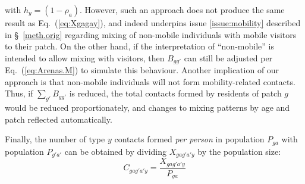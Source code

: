 with $h_y = (1-\rho_a)$.
However, such an approach does not produce the same result as Eq.~(\ref{eq:Xgagay}),
and indeed underpins issue \ref{issue:mobility} described in \S~\ref{meth.orig}
regarding mixing of non-mobile individuals with mobile visitors to their patch.
On the other hand, if the interpretation of ``non-mobile'' is intended to allow mixing with visitors,
then $B_{gg'}$ can still be adjusted per Eq.~(\ref{eq:Arenas.M}) to simulate this behaviour.
Another implication of our approach is that
non-mobile individuals will not form mobility-related contacts.
Thus, if $\sum_{g'} B_{gg'}$ is reduced,
the total contacts formed by residents of patch $g$ would be reduced proportionately,
and changes to mixing patterns by age and patch reflected automatically.
\par
Finally, the number of type $y$ contacts formed \textit{per person}
in population $P_{ga}$ with population $P_{g'a'}$ can be obtained by
dividing $X_{gag'a'y}$ by the population size:
\begin{equation}\label{eq:Cgagay}
  C_{gag'a'y} = \frac{X_{gag'a'y}}{P_{ga}}
\end{equation}
